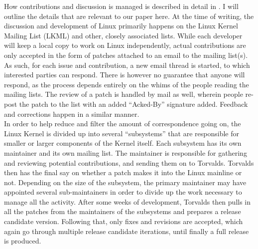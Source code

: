 How contributions and discussion is managed is described in detail in \cite{linux-participation}. I will outline the details that are relevant to our paper here. At the time of writing, the discussion and development of Linux primarily happens on the Linux Kernel Mailing List (LKML) and other, closely associated lists. While each developer will keep a local copy to work on Linux independently, actual contributions are only accepted in the form of patches attached to an email to the mailing list(s). As such, for each issue and contribution, a new email thread is started, to which interested parties can respond. There is however no guarantee that anyone will respond, as the process depends entirely on the whims of the people reading the mailing lists. The review of a patch is handled by mail as well, wherein people re-post the patch to the list with an added ``Acked-By'' signature added. Feedback and corrections happen in a similar manner. \\

In order to help reduce and filter the amount of correspondence going on, the Linux Kernel is divided up into several ``subsystems'' that are responsible for smaller or larger components of the Kernel itself. Each subsystem has its own maintainer and its own mailing list. The maintainer is responsible for gathering and reviewing potential contributions, and sending them on to Torvalds. Torvalds then has the final say on whether a patch makes it into the Linux mainline or not. Depending on the size of the subsystem, the primary maintainer may have appointed several sub-maintainers in order to divide up the work necessary to manage all the activity. After some weeks of development, Torvalds then pulls in all the patches from the maintainers of the subsystems and prepares a release candidate version. Following that, only fixes and revisions are accepted, which again go through multiple release candidate iterations, until finally a full release is produced. \\


